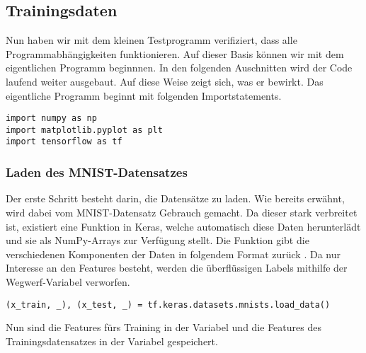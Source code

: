 \subsection{Trainingsdaten}
Nun haben wir mit dem kleinen Testprogramm verifiziert, dass alle
Programmabhängigkeiten funktionieren. Auf dieser Basis können wir mit dem
eigentlichen Programm beginnnen.
\para{}
In den folgenden Auschnitten wird der Code laufend weiter ausgebaut.
Auf diese Weise zeigt sich, was er bewirkt.
Das eigentliche Programm beginnt mit folgenden Importstatements.
\begin{verbatim}
import numpy as np
import matplotlib.pyplot as plt
import tensorflow as tf
\end{verbatim}

\subsubsection{Laden des MNIST-Datensatzes}
Der erste Schritt besteht darin, die Datensätze zu laden. Wie bereits
erwähnt, wird dabei vom MNIST-Datensatz Gebrauch gemacht. Da dieser stark verbreitet ist,
existiert eine Funktion in Keras, welche automatisch diese Daten herunterlädt
und sie als NumPy-Arrays zur Verfügung stellt.
Die Funktion gibt die verschiedenen Komponenten der Daten in folgendem Format zurück .
Da nur Interesse an den Features  besteht, werden die überflüssigen
Labels  mithilfe der Wegwerf-Variabel \code{\_} verworfen.
\begin{verbatim}
(x_train, _), (x_test, _) = tf.keras.datasets.mnists.load_data()
\end{verbatim}
Nun sind die Features fürs Training in der Variabel  und die
Features des Trainingsdatensatzes in der Variabel  gespeichert.

